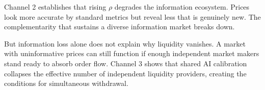 Channel 2 establishes that rising $\rho$ degrades the information ecosystem. Prices look more accurate by standard metrics but reveal less that is genuinely new. The complementarity that sustains a diverse information market breaks down.

But information loss alone does not explain why liquidity vanishes. A market with uninformative prices can still function if enough independent market makers stand ready to absorb order flow. Channel 3 shows that shared AI calibration collapses the effective number of independent liquidity providers, creating the conditions for simultaneous withdrawal.
